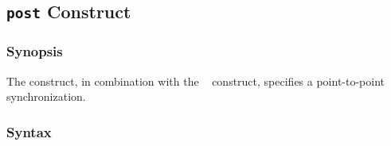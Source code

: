 %
%
%
%
%
%
%
%
%


\subsection{{\tt post} Construct}

\subsubsection*{Synopsis}

The {\tt {}} construct, in combination with the {\tt
{}} construct, specifies a point-to-point
synchronization.

\subsubsection*{Syntax}


